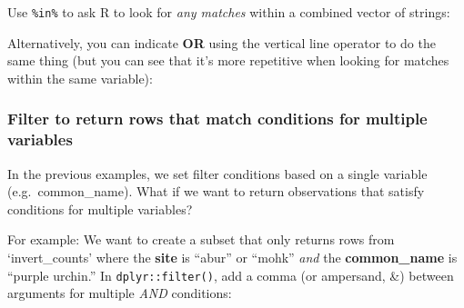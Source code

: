 \documentclass[]{book}
\newenvironment{Shaded}{\begin{snugshade}}{\end{snugshade}}
\newcommand{\KeywordTok}[1]{\textcolor[rgb]{0.13,0.29,0.53}{\textbf{#1}}}
\newcommand{\NormalTok}[1]{#1}
\newcommand{\OperatorTok}[1]{\textcolor[rgb]{0.81,0.36,0.00}{\textbf{#1}}}
\newcommand{\StringTok}[1]{\textcolor[rgb]{0.31,0.60,0.02}{#1}}
\begin{document}
Use \texttt{\%in\%} to ask R to look for \emph{any matches} within a combined vector of strings:

\begin{Shaded}
\end{Shaded}

Alternatively, you can indicate \textbf{OR} using the vertical line operator \texttt{\textbar{}} to do the same thing (but you can see that it's more repetitive when looking for matches within the same variable):

\begin{Shaded}
\end{Shaded}

\hypertarget{filter-to-return-rows-that-match-conditions-for-multiple-variables}{%
\subsubsection{Filter to return rows that match conditions for multiple variables}\label{filter-to-return-rows-that-match-conditions-for-multiple-variables}}

In the previous examples, we set filter conditions based on a single variable (e.g.~common\_name). What if we want to return observations that satisfy conditions for multiple variables?

For example: We want to create a subset that only returns rows from `invert\_counts' where the \textbf{site} is ``abur'' or ``mohk'' \emph{and} the \textbf{common\_name} is ``purple urchin.'' In \texttt{dplyr::filter()}, add a comma (or ampersand, \&) between arguments for multiple \emph{AND} conditions:
\end{document}
